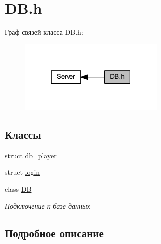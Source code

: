 \hypertarget{group__dbh}{}\section{D\+B.\+h}
\label{group__dbh}
Граф связей класса D\+B.\+h\+:\nopagebreak
\begin{figure}[H]
\begin{center}
\leavevmode
\includegraphics[width=198pt]{group__dbh}
\end{center}
\end{figure}
\subsection*{Классы}
\begin{DoxyCompactItemize}
\item 
struct \mbox{\hyperlink{structdb__player}{db\+\_\+player}}
\item 
struct \mbox{\hyperlink{structlogin}{login}}
\item 
class \mbox{\hyperlink{class_d_b}{DB}}
\begin{DoxyCompactList}\small\item\em Подключение к базе данных \end{DoxyCompactList}\end{DoxyCompactItemize}


\subsection{Подробное описание}
